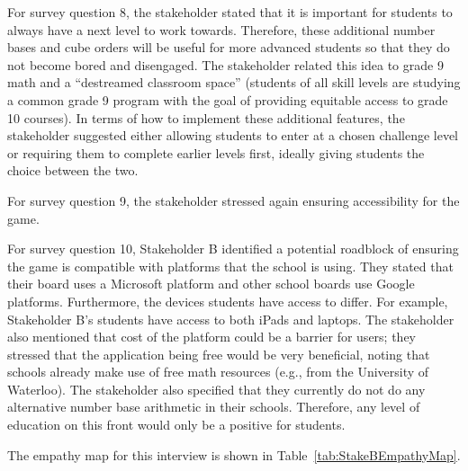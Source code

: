 \documentclass{article}
\begin{document}
For survey question 8, the stakeholder stated that it is important for students to always have a next level to work towards. Therefore, these additional number bases and cube orders will be useful for more advanced students so that they do not become bored and disengaged. The stakeholder related this idea to grade 9 math and a ``destreamed classroom space'' (students of all skill levels are studying a common grade 9 program with the goal of providing equitable access to grade 10 courses). In terms of how to implement these additional features, the stakeholder suggested either allowing students to enter at a chosen challenge level or requiring them to complete earlier levels first, ideally giving students the choice between the two.

For survey question 9, the stakeholder stressed again ensuring accessibility for the game.

For survey question 10, Stakeholder B identified a potential roadblock of ensuring the game is compatible with platforms that the school is using. They stated that their board uses a Microsoft platform and other school boards use Google platforms. Furthermore, the devices students have access to differ. For example, Stakeholder B's students have access to both iPads and laptops. The stakeholder also mentioned that cost of the platform could be a barrier for users; they stressed that the application being free would be very beneficial, noting that schools already make use of free math resources (e.g., from the University of Waterloo). The stakeholder also specified that they currently do not do any alternative number base arithmetic in their schools. Therefore, any level of education on this front would only be a positive for students.

The empathy map for this interview is shown in Table~\ref{tab:StakeBEmpathyMap}.
\end{document}
